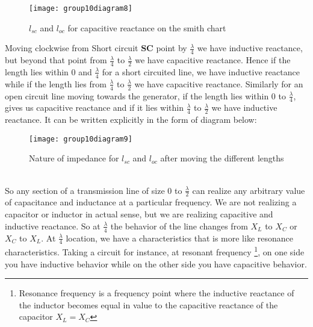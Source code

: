 \begin{figure}[h]
	\centering
	\texttt{[image: group10diagram8]}
	\caption{$ l_{sc} $ and $ l_{oc} $ for capacitive reactance on the smith chart}
\end{figure}

Moving clockwise from Short circuit \textbf{SC} point by $ \frac{\lambda}{4} $ we have inductive reactance, but beyond that point from $ \frac{\lambda}{4} $ to $ \frac{\lambda}{2} $ we have capacitive reactance. Hence if the length lies within 0 and $ \frac{\lambda}{4} $ for a short circuited line, we have inductive reactance while if the length lies from $ \frac{\lambda}{4} $ to $ \frac{\lambda}{2} $ we have capacitive reactance.
Similarly for an open circuit line moving towards the generator, if  the length lies within 0 to $ \frac{\lambda}{4} $, gives us capacitive reactance and if it lies within $ \frac{\lambda}{4} $ to $ \frac{\lambda}{2} $ we have inductive reactance. It can be written explicitly in the form of diagram below:\newline
\begin{figure}[h]
	\centering
	\texttt{[image: group10diagram9]}
	\caption{Nature of impedance for $ l_{sc} $ and $ l_{oc} $ after moving the different lengths}
\end{figure}\\So any section of a transmission line of size 0 to $ \frac{\lambda}{2} $ can realize any arbitrary value of capacitance and inductance at a particular frequency. We are not realizing a capacitor or inductor in actual sense, but we are realizing capacitive and inductive reactance. So at $ \frac{\lambda}{4} $ the behavior of the line changes from $ X_{L} $ to $ X_{C} $ or $ X_{C} $ to $ X_{L} $. At $\frac{\lambda}{4}$  location, we have a characteristics that is more like resonance characteristics. Taking a circuit for instance, at resonant frequency \footnote{Resonance frequency is a frequency point where the inductive reactance of the inductor becomes equal in value to the capacitive reactance of the capacitor \textbf{$ X_{L} = X_{C} $}}, on one side you have inductive behavior while on the other side you have capacitive behavior. 

